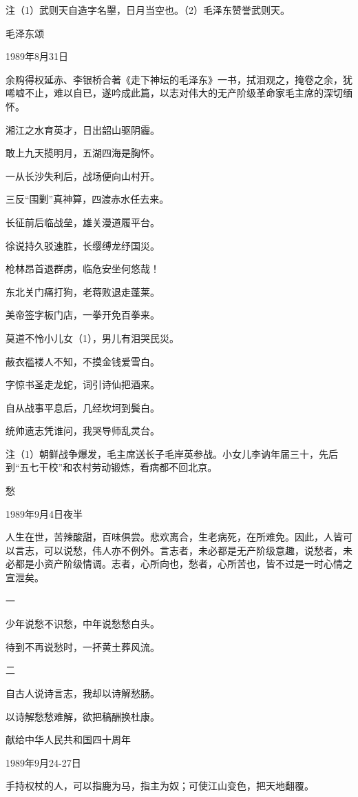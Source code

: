 \documentclass[../../dazhuan.tex]{subfiles}
\begin{document}
注（1）武则天自造字名曌，日月当空也。（2）毛泽东赞誉武则天。



毛泽东颂

1989年8月31日

余购得权延赤、李银桥合著《走下神坛的毛泽东》一书，拭泪观之，掩卷之余，犹唏嘘不止，难以自已，遂吟成此篇，以志对伟大的无产阶级革命家毛主席的深切缅怀。

湘江之水育英才，日出韶山驱阴霾。

敢上九天揽明月，五湖四海是胸怀。

一从长沙失利后，战场便向山村开。

三反“围剿”真神算，四渡赤水任去来。

长征前后临战垒，雄关漫道履平台。

徐说持久驳速胜，长缨缚龙纾国災。

枪林昂首退群虏，临危安坐何悠哉！

东北关门痛打狗，老蒋败退走蓬莱。

美帝签字板门店，一拳开免百拳来。

莫道不怜小儿女（1），男儿有泪哭民災。

蔽衣褴褛人不知，不摸金钱爱雪白。

字惊书圣走龙蛇，词引诗仙把酒来。

自从战事平息后，几经坎坷到鬓白。

统帅遗志凭谁问，我哭导师乱灵台。

注（1）朝鲜战争爆发，毛主席送长子毛岸英参战。小女儿李讷年届三十，先后到“五七干校”和农村劳动锻炼，看病都不回北京。



愁

1989年9月4日夜半

人生在世，苦辣酸甜，百味俱尝。悲欢离合，生老病死，在所难免。因此，人皆可以言志，可以说愁，伟人亦不例外。言志者，未必都是无产阶级意趣，说愁者，未必都是小资产阶级情调。志者，心所向也，愁者，心所苦也，皆不过是一时心情之宣泄矣。

一

少年说愁不识愁，中年说愁愁白头。

待到不再说愁时，一抔黄土葬风流。

二

自古人说诗言志，我却以诗解愁肠。

以诗解愁愁难解，欲把稿酬换杜康。



献给中华人民共和国四十周年

1989年9月24-27日

手持权杖的人，可以指鹿为马，指主为奴；可使江山变色，把天地翻覆。
\end{document}
